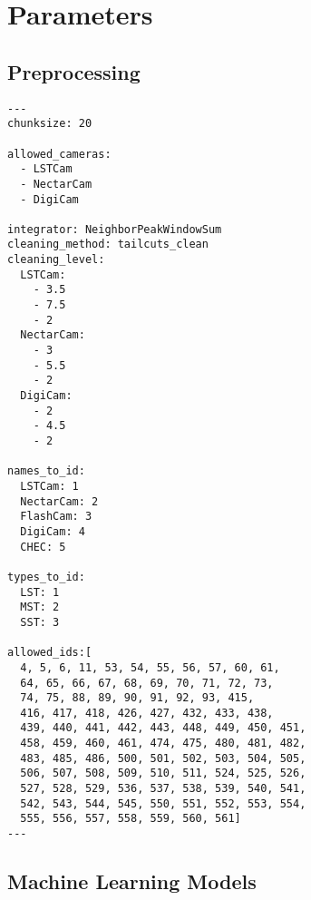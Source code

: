 \chapter{Parameters}
\label{sec:params}

\section{Preprocessing}

\begin{lstlisting}
---
chunksize: 20

allowed_cameras:
  - LSTCam
  - NectarCam
  - DigiCam

integrator: NeighborPeakWindowSum
cleaning_method: tailcuts_clean
cleaning_level:
  LSTCam:
    - 3.5
    - 7.5
    - 2
  NectarCam:
    - 3
    - 5.5
    - 2
  DigiCam:
    - 2
    - 4.5
    - 2

names_to_id:
  LSTCam: 1
  NectarCam: 2
  FlashCam: 3
  DigiCam: 4
  CHEC: 5

types_to_id:
  LST: 1
  MST: 2
  SST: 3

allowed_ids:[
  4, 5, 6, 11, 53, 54, 55, 56, 57, 60, 61,
  64, 65, 66, 67, 68, 69, 70, 71, 72, 73, 
  74, 75, 88, 89, 90, 91, 92, 93, 415, 
  416, 417, 418, 426, 427, 432, 433, 438,
  439, 440, 441, 442, 443, 448, 449, 450, 451,
  458, 459, 460, 461, 474, 475, 480, 481, 482,
  483, 485, 486, 500, 501, 502, 503, 504, 505, 
  506, 507, 508, 509, 510, 511, 524, 525, 526, 
  527, 528, 529, 536, 537, 538, 539, 540, 541, 
  542, 543, 544, 545, 550, 551, 552, 553, 554,
  555, 556, 557, 558, 559, 560, 561]
---
\end{lstlisting}

\section{Machine Learning Models}

